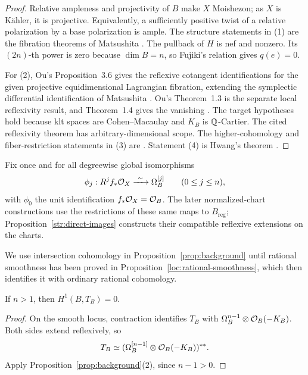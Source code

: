 \begin{proof}
Relative ampleness and projectivity of $B$ make $X$ Moishezon;
as $X$ is Kähler, it is projective. Equivalently, a sufficiently
positive twist of a relative polarization by a base polarization
is ample. The structure statements in (1) are the fibration
theorems of Matsushita
\cite{Matsushita1999,Matsushita2001}.
The pullback of $H$ is nef and nonzero. Its $(2n)$-th power is
zero because $\dim B=n$, so Fujiki's relation gives $q(e)=0$.

For (2), Ou's Proposition~3.6 gives the reflexive cotangent
identifications for the given projective equidimensional Lagrangian
fibration, extending the symplectic differential identification of
Matsushita \cite{Matsushita2005,Ou2019}. Ou's Theorem~1.3 is the separate
local reflexivity result, and Theorem~1.4 gives the vanishing
\cite{Ou2019}.
The target hypotheses hold because klt spaces are
Cohen--Macaulay \cite[Theorem~11.1(2), Corollaries~11.9 and~11.14]{Kollar1997}
and $K_B$ is $\mathbb Q$-Cartier.
The cited reflexivity theorem has arbitrary-dimensional scope.
The higher-cohomology and fiber-restriction statements in (3)
are \cite[Theorem~0.4]{ShenYin2022}.
Statement (4) is Hwang's theorem \cite[Theorem~1.2]{Hwang2008}.
\end{proof}

Fix once and for all degreewise global isomorphisms
\[
 \phi_j:R^j f_*\cO_X\xrightarrow{\ \sim\ }\Omega_B^{[j]}
                  \qquad(0\leq j\leq n),
\]
with \(\phi_0\) the unit identification \(f_*\mathcal O_X=\mathcal O_B\).
The later normalized-chart constructions use the restrictions of these
same maps to \(B_{\mathrm{reg}}\); Proposition~\ref{str:direct-images}
constructs their compatible reflexive extensions on the charts.

We use intersection cohomology in Proposition~\ref{prop:background}
until rational smoothness has been proved in
Proposition~\ref{loc:rational-smoothness}, which then identifies it with
ordinary rational cohomology.

\begin{corollary}\label{cor:tangent-rigidity}
If $n>1$, then $H^1(B,T_B)=0$.
\end{corollary}
\begin{proof}
On the smooth locus, contraction identifies
$T_B$ with $\Omega_B^{n-1}\otimes\mathcal O_B(-K_B)$.
Both sides extend reflexively, so
\[
 T_B\simeq
  (\Omega_B^{[n-1]}\otimes\mathcal O_B(-K_B))^{**}.
\]
Apply Proposition~\ref{prop:background}(2), since $n-1>0$.
\end{proof}

